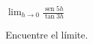 \item $\displaystyle \lim_{h \to 0} \frac{\operatorname{sen} 5h}{\tan 3h}$
\par
Encuentre el límite.
